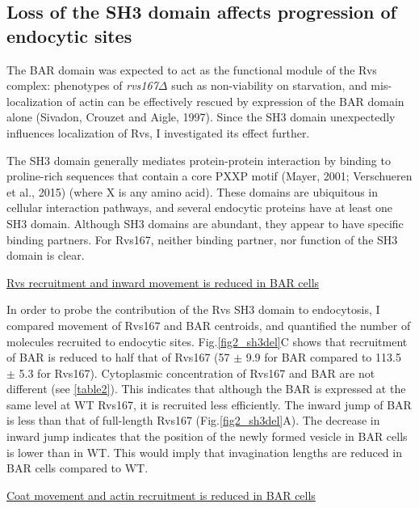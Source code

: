 	\subsection{Loss of the SH3 domain affects progression of \\
		endocytic sites}
	\label{delsh3_movement}
The BAR domain was expected to act as the functional module of the Rvs complex: phenotypes of \textit{rvs167$\Delta$}  such as non-viability on starvation, and mis-localization of actin can be effectively rescued by expression of the BAR domain alone (Sivadon, Crouzet and Aigle, 1997). Since the SH3 domain unexpectedly influences localization of Rvs, I investigated its effect further.

	\vspace{5mm}
The SH3 domain generally mediates protein-protein interaction by binding to proline-rich sequences that contain a core PXXP motif (Mayer, 2001; Verschueren et al., 2015) (where X is any amino acid). These domains are ubiquitous in cellular interaction pathways, and several endocytic proteins have at least one SH3 domain. Although SH3 domains are abundant, they appear to have specific binding partners. For Rvs167, neither binding partner, nor function of the SH3 domain is clear. 


	\vspace{5mm}
\underline{Rvs recruitment and inward movement is reduced in BAR cells}

In order to probe the contribution of the Rvs SH3 domain to endocytosis, I compared movement of Rvs167 and BAR centroids, and quantified the number of molecules recruited to endocytic sites. Fig.\ref{fig2_sh3del}C shows that recruitment of BAR is reduced to half that of Rvs167 (57 $\pm$ 9.9 for BAR compared to 113.5 $\pm$ 5.3 for Rvs167). Cytoplasmic concentration of Rvs167 and BAR are not different (see \ref{table2}). This indicates that although the BAR is expressed at the same level at WT Rvs167, it is recruited less efficiently. 
The inward jump of BAR is less than that of full-length Rvs167 (Fig.\ref{fig2_sh3del}A). The decrease in inward jump indicates that the position of the newly formed vesicle in BAR cells is lower than in WT. This would imply that invagination lengths are reduced in BAR cells compared to WT.

	\vspace{5mm}
	\newpage
	\underline{Coat movement and actin recruitment is reduced in BAR cells}
	
